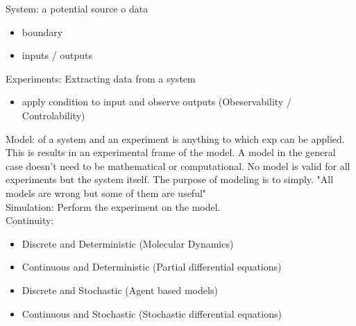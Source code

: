 \documentclass[hyperref]{labbook}
\numberwithin{equation}{experiment}
\numberwithin{table}{experiment}
\numberwithin{figure}{experiment}
\begin{document}
System: a potential source o data
\begin{itemize}
\item{\color{red} boundary }
\item inputs / outputs
\end{itemize}
Experiments: Extracting data from a system 
\begin{itemize}
\item apply condition to input and observe outputs
(Obeservability / Controlability)
\end{itemize}
Model: of a system {\color{red} and an experiment is anything} to which exp can be applied.
This is results in an experimental frame of the model. A model in the general case doesn't need to be mathematical or computational. No model is valid for all experiments but the system itself.
The purpose of modeling is to simply. "All models are wrong but some of them are useful" \\[1em]
Simulation: Perform the experiment on the model. \\[1em]
Continuity: 
\begin{itemize}
\item Discrete and Deterministic  (Molecular Dynamics)
\item {\color{red} Continuous  and Deterministic (Partial differential equations)}
\item Discrete and Stochastic  (Agent based models)
\item Continuous  and Stochastic (Stochastic differential equations) 
\end{itemize}
\end{document}
